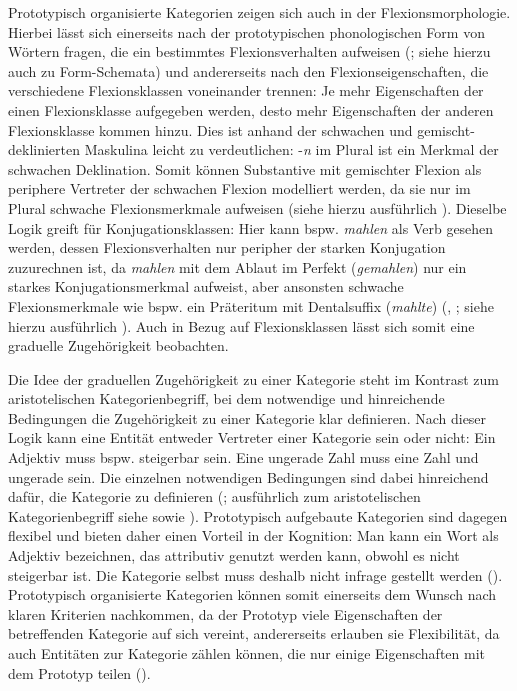 Prototypisch organisierte Kategorien zeigen sich auch in der Flexionsmorphologie. Hierbei lässt sich einerseits nach der prototypischen phonologischen Form von Wörtern fragen, die ein bestimmtes Flexionsverhalten aufweisen (\cite[111--135]{Bybee.1985}; siehe hierzu auch  zu Form-Schemata) und andererseits nach den Flexionseigenschaften, die verschiedene Flexionsklassen voneinander trennen: Je mehr Eigenschaften der einen Flexionsklasse aufgegeben werden, desto mehr Eigenschaften der anderen Flexionsklasse kommen hinzu. Dies ist anhand der schwachen und gemischt-deklinierten Maskulina leicht zu verdeutlichen: -\textit{n} im Plural ist ein Merkmal der schwachen Deklination. Somit können Substantive mit gemischter Flexion als periphere Vertreter der schwachen Flexion modelliert werden, da sie nur im Plural schwache Flexionsmerkmale aufweisen (siehe hierzu ausführlich ). Dieselbe Logik greift für Konjugationsklassen: Hier kann bspw. \textit{mahlen} als Verb gesehen werden, dessen Flexionsverhalten nur peripher der starken Konjugation zuzurechnen ist, da \textit{mahlen} mit dem Ablaut im Perfekt (\textit{gemahlen}) nur ein starkes Konjugationsmerkmal aufweist, aber ansonsten schwache Flexionsmerkmale wie bspw. ein Präteritum mit Dentalsuffix (\textit{mahlte}) (\cite[80]{Bittner.1996}, \cite[153--156]{Nowak.2013}; siehe hierzu ausführlich ). Auch in Bezug auf Flexionsklassen lässt sich somit eine graduelle Zugehörigkeit beobachten.

Die Idee der graduellen Zugehörigkeit zu einer Kategorie steht im Kontrast zum aristotelischen Kategorienbegriff, bei dem notwendige und hinreichende Bedingungen die Zugehörigkeit zu einer Kategorie klar definieren. Nach dieser Logik kann eine Entität entweder Vertreter einer Kategorie sein oder nicht: Ein Adjektiv muss bspw. steigerbar sein. Eine ungerade Zahl muss eine Zahl und ungerade sein. Die einzelnen notwendigen Bedingungen sind dabei hinreichend dafür, die Kategorie zu definieren (\cite[11--13]{Kleiber.1993}; ausführlich zum aristotelischen Kategorienbegriff siehe \cite[11--28]{Kleiber.1993} sowie \cite[21--29]{Taylor.1995}). Prototypisch aufgebaute Kategorien sind dagegen flexibel und bieten daher einen Vorteil in der Kognition: Man kann ein Wort als Adjektiv bezeichnen, das attributiv genutzt werden kann, obwohl es nicht steigerbar ist. Die Kategorie selbst muss deshalb nicht infrage gestellt werden (\cite[53--54]{Taylor.1995}). Prototypisch organisierte Kategorien können somit einerseits dem Wunsch nach klaren Kriterien nachkommen, da der Prototyp viele Eigenschaften der betreffenden Kategorie auf sich vereint, andererseits erlauben sie Flexibilität, da auch Entitäten zur Kategorie zählen können, die nur einige Eigenschaften mit dem Prototyp teilen (\cite[54]{Taylor.1995}).\largerpage

